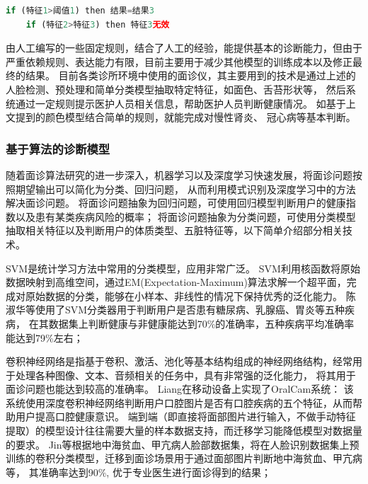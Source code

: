 \begin{lstlisting}[language={Python}, title=诊断规则]
    if (特征1>阈值1) then 结果=结果3
    if (特征2>特征3) then 特征3无效
\end{lstlisting}

由人工编写的一些固定规则，结合了人工的经验，能提供基本的诊断能力，但由于严重依赖规则、表达能力有限，目前主要用于减少其他模型的训练成本以及修正最终的结果。
目前各类诊所环境中使用的面诊仪，其主要用到的技术是通过上述的人脸检测、预处理和简单分类模型抽取特定特征，如面色、舌苔形状等，
然后系统通过一定规则提示医护人员相关信息，帮助医护人员判断健康情况。
如基于上文提到的颜色模型结合简单的规则，就能完成对慢性肾炎\cite{刘金涛2014基于数字化慢性肾炎湿热证面诊特征研究}、
冠心病\cite{陈聪2019冠心病痰瘀互结证面诊图像特征参数分析}等基本判断。

\subsubsection{基于算法的诊断模型}
随着面诊算法研究的进一步深入，机器学习以及深度学习快速发展，将面诊问题按照期望输出可以简化为分类、回归问题，
从而利用模式识别及深度学习中的方法解决面诊问题。
将面诊问题抽象为回归问题，可使用回归模型判断用户的健康指数以及患有某类疾病风险的概率；
将面诊问题抽象为分类问题，可使用分类模型抽取相关特征以及判断用户的体质类型、五脏特征等，以下简单介绍部分相关技术。

SVM\cite{cortes1995support}是统计学习方法中常用的分类模型，应用非常广泛。
SVM利用核函数将原始数据映射到高维空间，通过EM(Expectation-Maximum)算法求解一个超平面，完成对原始数据的分类，能够在小样本、非线性的情况下保持优秀的泛化能力。
陈淑华等\cite{chen2016facial}使用了SVM分类器用于判断用户是否患有糖尿病、乳腺癌、胃炎等五种疾病，
在其数据集上判断健康与非健康能达到70\%的准确率，五种疾病平均准确率能达到79\%左右；

卷积神经网络\cite{li2016survey}是指基于卷积、激活、池化等基本结构组成的神经网络结构，经常用于处理各种图像、文本、音频相关的任务中，具有非常强的泛化能力，
将其用于面诊问题也能达到较高的准确率。
Liang\cite{liang2020oralcam}在移动设备上实现了OralCam系统：
该系统使用深度卷积神经网络判断用户口腔图片是否有口腔疾病的五个特征，从而帮助用户提高口腔健康意识。
端到端（即直接将面部图片进行输入，不做手动特征提取）的模型设计往往需要大量的样本数据支持，而迁移学习能降低模型对数据量的要求。
Jin\cite{jin2020deep}等根据地中海贫血、甲亢病人脸部数据集，将在人脸识别数据集上预训练的卷积分类模型，迁移到面诊场景用于通过面部图片判断地中海贫血、甲亢病等，
其准确率达到90\%, 优于专业医生进行面诊得到的结果；

